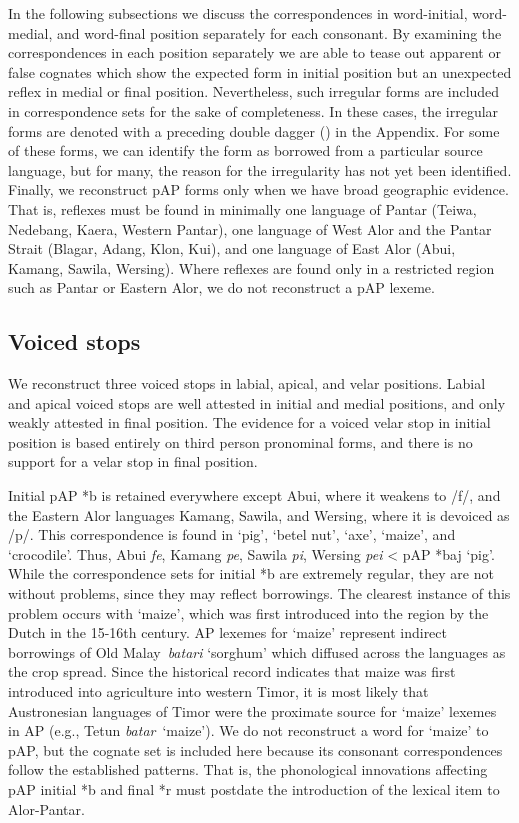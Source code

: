 In the following subsections we discuss the correspondences in word-initial, word-medial, and word-final position separately for each consonant. By examining the correspondences in each position separately we are able to tease out apparent or false cognates which show the expected form in initial position but an unexpected reflex in medial or final position. Nevertheless, such irregular forms are included in correspondence sets for the sake of completeness. In these cases, the irregular forms are denoted with a preceding double dagger ({\ddag}) in the Appendix. For some of these forms, we can identify the form as borrowed from a particular source language, but for many, the reason for the irregularity has not yet been identified. Finally, we reconstruct pAP forms only when we have broad geographic evidence. That is, reflexes must be found in minimally one language of Pantar (Teiwa, Nedebang, Kaera, Western Pantar), one language of West Alor and the Pantar Strait (Blagar, Adang, Klon, Kui), and one language
of East Alor (Abui, Kamang, Sawila, Wersing). Where reflexes are found only in a restricted region such as Pantar or Eastern Alor, we do not reconstruct a pAP lexeme.

\subsection{ Voiced stops}
\label{bkm:Ref177294340}We reconstruct three voiced stops in labial, apical, and velar positions. Labial and apical voiced stops are well attested in initial and medial positions, and only weakly attested in final position. The evidence for a voiced velar stop in initial position is based entirely on third person pronominal forms, and there is no support for a velar stop in final position.

Initial pAP *b is retained everywhere except Abui, where it weakens to /f/, and the Eastern Alor languages Kamang, Sawila, and Wersing, where it is devoiced as /p/. This correspondence is found in `pig', `betel nut', `axe', `maize', and `crocodile'. Thus, Abui \textit{fe}, Kamang \textit{pe}, Sawila \textit{pi}, Wersing \textit{pei} {\textless} pAP *baj `pig'. While the correspondence sets for initial *b are extremely regular, they are not without problems, since they may reflect borrowings. The clearest instance of this problem occurs with `maize', which was first introduced into the region by the Dutch in the 15-16th century. AP lexemes for `maize' represent indirect borrowings of Old Malay~\textit{batari }`sorghum' which diffused across the languages as the crop spread. Since the historical record indicates that maize was first introduced into agriculture into western Timor, it is most likely that Austronesian languages of Timor were the proximate source for `maize' lexemes in AP (e.g., Tetun \textit{
batar}~`maize'). We do not reconstruct a word for `maize' to pAP, but the cognate set is included here because its consonant correspondences follow the established patterns. That is, the phonological innovations affecting pAP initial *b and final *r must postdate the introduction of the lexical item to Alor-Pantar.

